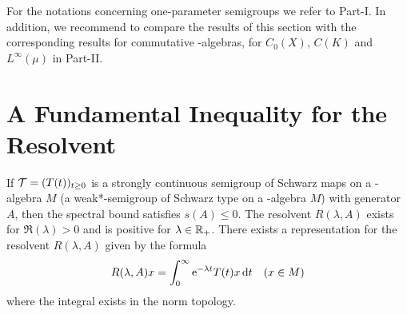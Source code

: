For the notations concerning one-parameter semigroups we refer to Part-I.
In addition, we recommend to compare the results of this section with the corresponding results for commutative \CA-algebras, \ie for $ C_{0}(X) $, $ C(K) $ and $ L^\infty(\mu) $ in Part-II.
\section{A Fundamental Inequality for the Resolvent}\label{sec:d1-2}
If\/ $ \TT = (T(t))_{t \geq 0} $ is a strongly continuous semigroup of Schwarz maps on a \CA-algebra $ M $ (\resp a weak*-semigroup of Schwarz type on a \WA-algebra $ M $) with generator $ A $, then the spectral bound satisfies $ s(A) \leq 0 $.
The resolvent $ R(\lambda, A) $ exists for $ \Re(\lambda) > 0 $ and is positive for $ \lambda \in \mathbb{R}_{+} $.
There exists a representation for the resolvent $ R(\lambda,A) $ given by the formula
\[
 	R(\lambda,A)x = \int_{0}^\infty \mathrm{e}^{-\lambda t} T(t)x  \mathop{}\!\mathrm{d}{t}  \quad (x \in M)
\]
where the integral exists in the norm topology.

